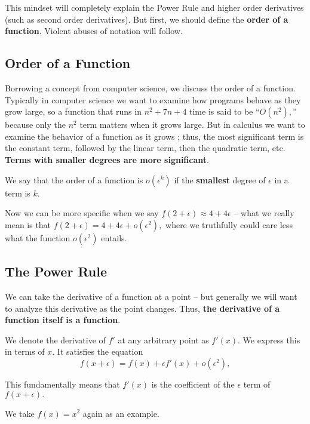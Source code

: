 \documentclass[blue,onecol]{shooting}
\begin{document}
This mindset will completely explain the Power Rule and higher order derivatives (such as second order derivatives).  But first, we should define the \textbf{order of a function}. Violent abuses of notation will follow.

\subsection{Order of a Function}
Borrowing a concept from computer science, we discuss the order of a function. Typically in computer science we want to examine how programs behave as they grow large, so a function that runs in $n^2+7n+4$ time is said to be ``$O(n^2),$'' because only the $n^2$ term matters when it grows large. But in calculus we want to examine the behavior of a function as it grows ; thus, the most significant term is the constant term, followed by the linear term, then the quadratic term, etc. \textbf{Terms with smaller degrees are more significant}.

\begin{defi}[Order]
We say that the order of a function is $o(\epsilon^k)$ if the \textbf{smallest} degree of $\epsilon$ in a term is $k.$
\end{defi}

Now we can be more specific when we say $f(2+\epsilon)\approx 4+4\epsilon$ -- what we really mean is that $f(2+\epsilon)=4+4\epsilon+o(\epsilon^2),$ where we truthfully could care less what the function $o(\epsilon^2)$ entails.

\subsection{The Power Rule}

We can take the derivative of a function at a point -- but generally we will want to analyze this derivative as the point changes. Thus, \textbf{the derivative of a function itself is a function}.

\begin{defi}
We denote the derivative of $f'$ at any arbitrary point as $f'(x).$ We express this in terms of $x.$ It satisfies the equation
\[f(x+\epsilon)=f(x)+\epsilon f'(x)+o(\epsilon^2),\]
\end{defi}

This fundamentally means that $f'(x)$ is the coefficient of the $\epsilon$ term of $f(x+\epsilon).$

We take $f(x)=x^2$ again as an example.
\end{document}

